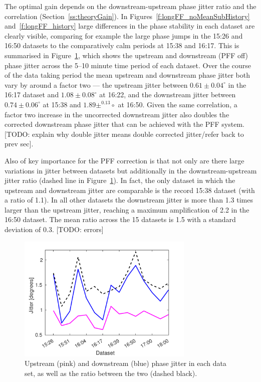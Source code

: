 The optimal gain depends on the downstream-upstream phase jitter ratio and the correlation (Section~\ref{ss:theoryGain}). In Figures~\ref{f:longFF_noMeanSubHistory} and~\ref{f:longFF_history} large differences in the phase stability in each dataset are clearly visible, comparing for example the large phase jumps in the 15:26 and 16:50 datasets to the comparatively calm periods at 15:38 and 16:17. This is summarised in Figure~\ref{f:longFF_jitFFOff}, which shows the upstream and downstream (PFF off) phase jitter across the 5--10 minute time period of each dataset. Over the course of the data taking period the mean upstream and downstream phase jitter both vary by around a factor two --- the upstream jitter between \(0.61\pm0.04^\circ\) in the 16:17 dataset and \(1.08\pm0.08^\circ\) at 16:22, and the downstream jitter between \(0.74\pm0.06^\circ\) at 15:38 and \(1.89\pm^0.13\circ\) at 16:50. Given the same correlation, a factor two increase in the uncorrected downstream jitter also doubles the corrected downstream phase jitter that can be achieved with the PFF system. [TODO: explain why double jitter means double corrected jitter/refer back to prev sec].

Also of key importance for the PFF correction is that not only are there large variations in jitter between datasets but additionally in the downstream-upstream jitter ratio (dashed line in Figure~\ref{f:longFF_jitFFOff}). In fact, the only dataset in which the upstream and downstream jitter are comparable is the record 15:38 dataset (with a ratio of 1.1). In all other datasets the downstream jitter is more than 1.3 times larger than the upstream jitter, reaching a maximum amplification of 2.2 in the 16:50 dataset. The mean ratio across the 15 datasets is 1.5 with a standard deviation of 0.3. [TODO: errors]

\begin{figure}
  \centering
  \includegraphics[width=0.75\textwidth]{Figures/feedforward/longFF_jitDatSetFFOff}
  \caption{Upstream (pink) and downstream (blue) phase jitter in each data set, as well as the ratio between the two (dashed black).}
  \label{f:longFF_jitFFOff}
\end{figure}


